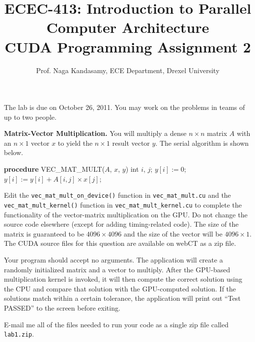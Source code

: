 \documentclass[12.0pt]{article}
\begin{document}
\title{ECEC-413: Introduction to Parallel Computer Architecture \\
CUDA Programming Assignment 2}
\author{Prof. Naga Kandasamy, ECE Department, Drexel University}
\maketitle %
\date{}

\noindent The lab is due on October 26, 2011. You may work on the problems in teams of up to two people.
\vspace{12pt}

\noindent \textbf{Matrix-Vector Multiplication.} You will multiply a dense $n \times n $ matrix $A$ with an $n \times 1$ vector $x$ to yield the $n \times 1$ result vector $y$. The serial algorithm is shown below. \vspace{12pt}

\begin{algorithm}[!h]
\begin{algorithmic}[1]
	\STATE \textbf{procedure} VEC\_MAT\_MULT($A$, $x$, $y$)
    \STATE int $i$, $j$;
        \STATE $y[i] := 0$;
				\STATE $y[i] := y[i] + A[i, j] \times x[j]$;
			\ENDFOR
	\ENDFOR
\end{algorithmic}
\end{algorithm}

\noindent Edit the \texttt{vec\_mat\_mult\_on\_device()} function in \texttt{vec\_mat\_mult.cu} and the \texttt{vec\_mat\_mult\_kernel()} function in \texttt{vec\_mat\_mult\_kernel.cu} to complete the functionality of the vector-matrix multiplication on the GPU. Do not change the source code elsewhere (except for adding timing-related code). The size of the matrix is guaranteed to be $4096 \times 4096$ and the size of the vector will be $4096 \times 1$. The CUDA source files for this question are available on webCT as a zip file.

Your program should accept no arguments. The application will create a randomly initialized matrix and a vector to multiply. After the GPU-based multiplication kernel is invoked, it will then compute the correct solution using the CPU and compare that solution with the GPU-computed solution. If the solutions match within a certain tolerance, the application will print out ``Test PASSED'' to the screen before exiting. \vspace{12pt}

\noindent E-mail me all of the files needed to run your code as a single zip file called \texttt{lab1.zip}. \vspace{12pt}
\end{document}
